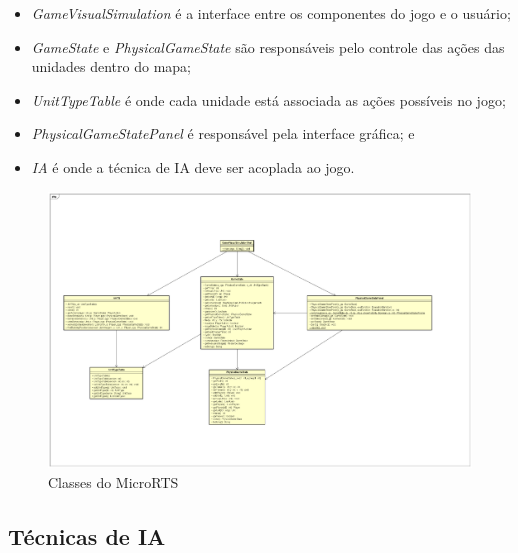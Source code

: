 \begin{itemize}
	\item \textit{GameVisualSimulation} é a interface entre os componentes do jogo e o usuário;
	\item \textit{GameState} e \textit{PhysicalGameState} são responsáveis pelo controle das ações das unidades dentro do mapa;
	\item \textit{UnitTypeTable} é onde cada unidade está associada as ações possíveis no jogo;
	\item \textit{PhysicalGameStatePanel} é responsável pela interface gráfica; e
	\item \textit{IA} é onde a técnica de IA deve ser acoplada ao jogo.
\end{itemize}

\begin{figure}[ht]
	\centering
	\includegraphics[width=1\textwidth]{fig/classes.pdf}
	\caption{Classes do MicroRTS}
	\label{fig:classes}
\end{figure} 

\subsection{Técnicas de IA}